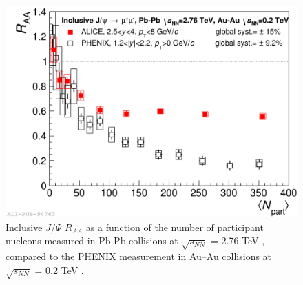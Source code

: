 %
\begin{figure}
  \centering
  \includegraphics[scale=0.15]{figures/jpsi.png}
  \caption{Inclusive $J/\Psi$ $R_{AA}$ as a function of the number of participant nucleons measured in Pb-Pb collisions at $\sqrt{s_{NN}}$ = 2.76 TeV \cite{jpsialice}, compared to the PHENIX measurement in Au–Au collisions at $\sqrt{s_{NN}}$ = 0.2 TeV \cite{jpsiphenix}.}
  \label{fig:jpsi}
\end{figure}
%